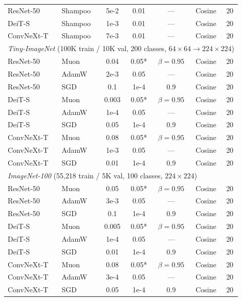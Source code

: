 \begin{table}[t]
\begin{tabular}{@{}llccccc@{}}
\midrule
ResNet-50   & Shampoo & 5e-2 & 0.01 & ---           & Cosine & 20 \\
DeiT-S      & Shampoo & 1e-3 & 0.01 & ---           & Cosine & 20 \\
ConvNeXt-T  & Shampoo & 7e-3 & 0.01 & ---           & Cosine & 20 \\
\midrule
\midrule
\multicolumn{7}{l}{\textit{Tiny-ImageNet} (100K train / 10K val, 200 classes, $64\times64 \to 224\times224$)} \\
\midrule
ResNet-50   & Muon  & 0.04  & 0.05* & $\beta=0.95$ & Cosine & 20 \\
ResNet-50   & AdamW & 2e-3  & 0.05  & ---           & Cosine & 20 \\
ResNet-50   & SGD   & 0.1   & 1e-4  & 0.9           & Cosine & 20 \\
\midrule
DeiT-S      & Muon  & 0.003 & 0.05* & $\beta=0.95$ & Cosine & 20 \\
DeiT-S      & AdamW & 1e-4  & 0.05  & ---           & Cosine & 20 \\
DeiT-S      & SGD   & 0.05  & 1e-4  & 0.9           & Cosine & 20 \\
\midrule
ConvNeXt-T  & Muon  & 0.08  & 0.05* & $\beta=0.95$ & Cosine & 20 \\
ConvNeXt-T  & AdamW & 1e-3  & 0.05  & ---           & Cosine & 20 \\
ConvNeXt-T  & SGD   & 0.01  & 1e-4  & 0.9           & Cosine & 20 \\
\midrule
\midrule
\multicolumn{7}{l}{\textit{ImageNet-100} (55{,}218 train / 5K val, 100 classes, $224\times224$)} \\
\midrule
ResNet-50   & Muon  & 0.05  & 0.05* & $\beta=0.95$ & Cosine & 20 \\
ResNet-50   & AdamW & 3e-3  & 0.05  & ---           & Cosine & 20 \\
ResNet-50   & SGD   & 0.1   & 1e-4  & 0.9           & Cosine & 20 \\
\midrule
DeiT-S      & Muon  & 0.005 & 0.05* & $\beta=0.95$ & Cosine & 20 \\
DeiT-S      & AdamW & 1e-4  & 0.05  & ---           & Cosine & 20 \\
DeiT-S      & SGD   & 0.01  & 1e-4  & 0.9           & Cosine & 20 \\
\midrule
ConvNeXt-T  & Muon  & 0.08  & 0.05* & $\beta=0.95$ & Cosine & 20 \\
ConvNeXt-T  & AdamW & 3e-4  & 0.05  & ---           & Cosine & 20 \\
ConvNeXt-T  & SGD   & 0.05  & 1e-4  & 0.9           & Cosine & 20 \\

\end{tabular}
\end{table}
